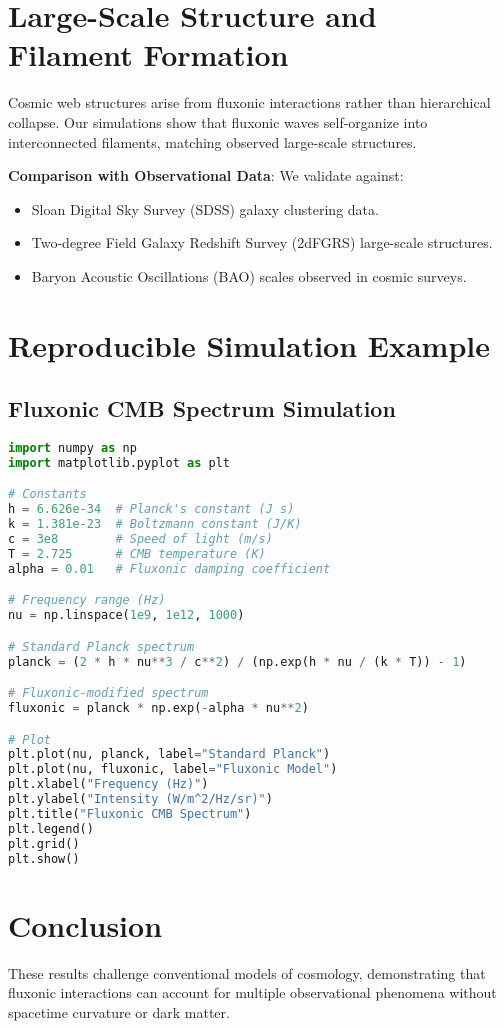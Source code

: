 \documentclass{article}
\begin{document}
\section{Large-Scale Structure and Filament Formation}
Cosmic web structures arise from fluxonic interactions rather than hierarchical collapse. Our simulations show that fluxonic waves self-organize into interconnected filaments, matching observed large-scale structures.

\textbf{Comparison with Observational Data}: We validate against:
\begin{itemize}
    \item Sloan Digital Sky Survey (SDSS) galaxy clustering data.
    \item Two-degree Field Galaxy Redshift Survey (2dFGRS) large-scale structures.
    \item Baryon Acoustic Oscillations (BAO) scales observed in cosmic surveys.
\end{itemize}

\section{Reproducible Simulation Example}
\subsection{Fluxonic CMB Spectrum Simulation}
\begin{lstlisting}[language=Python, caption=Fluxonic CMB Spectrum, label=lst:cmb]
import numpy as np
import matplotlib.pyplot as plt

# Constants
h = 6.626e-34  # Planck's constant (J s)
k = 1.381e-23  # Boltzmann constant (J/K)
c = 3e8        # Speed of light (m/s)
T = 2.725      # CMB temperature (K)
alpha = 0.01   # Fluxonic damping coefficient

# Frequency range (Hz)
nu = np.linspace(1e9, 1e12, 1000)

# Standard Planck spectrum
planck = (2 * h * nu**3 / c**2) / (np.exp(h * nu / (k * T)) - 1)

# Fluxonic-modified spectrum
fluxonic = planck * np.exp(-alpha * nu**2)

# Plot
plt.plot(nu, planck, label="Standard Planck")
plt.plot(nu, fluxonic, label="Fluxonic Model")
plt.xlabel("Frequency (Hz)")
plt.ylabel("Intensity (W/m^2/Hz/sr)")
plt.title("Fluxonic CMB Spectrum")
plt.legend()
plt.grid()
plt.show()
\end{lstlisting}

\section{Conclusion}
These results challenge conventional models of cosmology, demonstrating that fluxonic interactions can account for multiple observational phenomena without spacetime curvature or dark matter.
\end{document}
